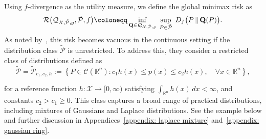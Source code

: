\documentclass[accepted]{article}
\theoremstyle{plain} %
\theoremstyle{definition}
\theoremstyle{remark}
\newcommand{\bQ}{\mathbf{Q}}
\begin{document}
Using $f$-divergence as the utility measure, we define the global minimax risk as
\begin{equation}\label{eqn: global minimax functional problem}
\mathcal{R}\big(\mathcal{Q}_{\mathcal{X},\tilde{\mathcal{P}},g},\tilde{\mathcal{P}},f\big) \coloneqq \inf_{\bQ \in \mathcal{Q}_{\mathcal{X},\tilde{\mathcal{P}},g}} \hspace{0.1cm} \sup_{P \in \tilde{\mathcal{P}}}\hspace{0.1cm} D_f\big(P \, \| \, \bQ(P)\big).
\end{equation}
As noted by~\citet{park2024exactly}, this risk becomes vacuous in the continuous setting if the distribution class $\tilde{\mathcal{P}}$ is unrestricted. To address this, they consider a restricted class of distributions defined as
\begin{equation}\label{eqn: set of distributions}
   \tilde{\mathcal{P}} = \tilde{\mathcal{P}}_{c_1, c_2, h} := \left\{ P \in \mathcal{C}(\mathbb{R}^n) : c_1 h(x) \leq p(x) \leq c_2 h(x), \quad \forall x \in \mathbb{R}^n \right\}, 
\end{equation}

for a reference function $h : \mathcal{X} \to [0, \infty)$ satisfying $\int_{\mathbb{R}^n} h(x)\,dx < \infty$, and constants $c_2 > c_1 \geq 0$. 
This class captures a broad range of practical distributions, including mixtures of Gaussians and Laplace distributions. See the example below and further discussion in Appendices~\ref{appendix: laplace mixture} and~\ref{appendix: gaussian ring}.
\end{document}

